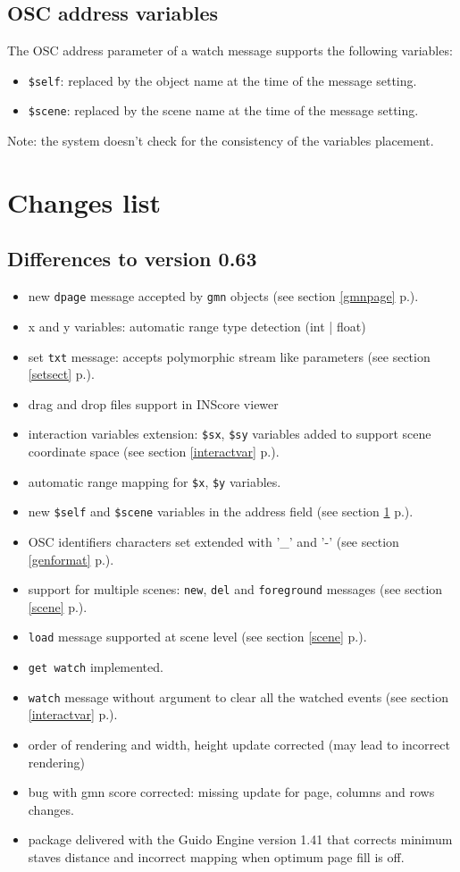 \documentclass[a4paper,twoside]{report}
\newcommand{\toplevel}[1]	{\chapter{#1}}
\newcommand{\sublevel}[1]	{\section{#1}}
\newcommand{\fullref}[1]	{\ref{#1} p.\pageref{#1}}
\newcommand{\OSC}[1]		{\texttt{#1}}
\begin{document}
\sublevel{OSC address variables}
\label{oscvar}
The OSC address parameter of a watch message supports the following variables:
\begin{itemize}
\item \OSC{\$self}: replaced by the object name at the time of the message setting.
\item \OSC{\$scene}: replaced by the scene name at the time of the message setting.
\end{itemize}
Note: the system doesn't check for the consistency of the variables placement.

\toplevel{ Changes list}

\sublevel{Differences to version 0.63}
\begin{itemize}
\item new \OSC{dpage} message accepted by \OSC{gmn} objects (see section \fullref{gmnpage}).
\item x and y variables: automatic range type detection (int | float)
\item set \OSC{txt} message: accepts polymorphic stream like parameters (see section \fullref{setsect}).
\item drag and drop files support in INScore viewer
\item interaction variables extension: \OSC{\$sx}, \OSC{\$sy} variables added to support scene coordinate space (see section \fullref{interactvar}).
\item automatic range mapping for \OSC{\$x}, \OSC{\$y} variables.
\item new \OSC{\$self} and \OSC{\$scene} variables in the address field (see section \fullref{oscvar}).
\item OSC identifiers characters set extended with '\_' and '-' (see section \fullref{genformat}).
\item support for multiple scenes: \OSC{new}, \OSC{del} and \OSC{foreground} messages (see section \fullref{scene}).
\item \OSC{load} message supported at scene level (see section \fullref{scene}).
\item \OSC{get watch} implemented.
\item \OSC{watch} message without argument to clear all the watched events (see section \fullref{interactvar}).
\item order of rendering and width, height update corrected (may lead to incorrect rendering)
\item bug with gmn score corrected: missing update for page, columns and rows changes.
\item package delivered with the Guido Engine version 1.41 that corrects minimum staves distance and incorrect mapping when optimum page fill is off.
\end{itemize}
\end{document}
